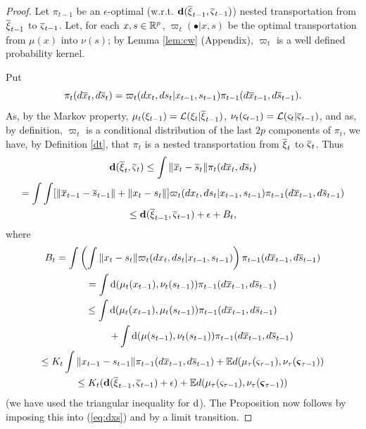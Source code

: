 \documentclass{article}              %
\begin{document}
\begin{proof}
Let $\pi_{t-1}$ be an $\epsilon$-optimal (w.r.t. $\mathbf{d}(\overline{\xi}_{t-1},\overline{\varsigma}_{t-1})$)
nested transportation from $\overline{\xi}_{t-1}$ to $\overline{\varsigma}_{t-1}$. Let,
for each $x,s\in\mathbb{R}^{p}$, $\varpi_{t}(\bullet|x,s)$ be the optimal
transportation from $\mu(x)$ into $\nu(s)$; by Lemma \ref{lem:cw} (Appendix),
$\varpi_{t}$ is a well defined probability kernel.

Put
\[
\pi_{t}(d\overline{x}_{t},d\overline{s}_{t})=\varpi_{t}(dx_{t},ds_{t}|x_{t-1},s_{t-1})\pi_{t-1}(d\overline{x}_{t-1},d\overline{s}_{t-1}).
\]
As, by the Markov property, $\mu_{t}(\xi_{t-1})=\mathcal{L}(\xi_{t}|\overline{\xi}_{t-1})$,
$\nu_{t}(\varsigma_{t-1})=\mathcal{L}(\varsigma_{t}|\overline{\varsigma}_{t-1})$,
and as, by definition, $\varpi_{t}$ is a conditional distribution
of the last $2p$ components of $\pi_{t}$, we have, by Definition
\ref{dt}, that $\pi_{t}$ is a nested transportation from $\overline{\xi}_{t}$
to $\overline{\varsigma}_{t}$. Thus 
\begin{multline}
\mathbf{d}(\overline{\xi}_{t},\overline{\varsigma}_{t})\leq\int\|\overline{x}_{t}-\overline{s}_{t}\|\pi_{t}(d\overline{x}_{t},d\overline{s}_{t})\\
=\int\int[\|\overline{x}_{t-1}-\overline{s}_{t-1}\|+\|x_{t}-s_{t}\|]\varpi_{t}(dx_{t},ds_{t}|x_{t-1},s_{t-1})\pi_{t-1}(d\overline{x}_{t-1},d\overline{s}_{t-1})\\
\leq\mathbf{d}(\overline{\xi}_{t-1},\overline{\varsigma}_{t-1})+\epsilon+B_{t},\label{eq:dxs}
\end{multline}
where
\begin{multline*}
B_{t}=\int\left(\int\|x{}_{t}-s_{t}\|\varpi_{t}(dx_{t},ds_{t}|x_{t-1},s_{t-1})\right)\pi_{t-1}(d\overline{x}_{t-1},d\overline{s}_{t-1})\\
=\mathrm{\int d}(\mu_{t}(x_{t-1}),\nu_{t}(s_{t-1}))\pi_{t-1}(d\overline{x}_{t-1},d\overline{s}_{t-1})\\
\leq\int\mathrm{d}(\mu_{t}(x_{t-1}),\mu_{t}(s_{t-1}))\pi_{t-1}(d\overline{x}_{t-1},d\overline{s}_{t-1})\\
\qquad\qquad+\int\mathrm{d}(\mu(s_{t-1}),\nu_{t}(s_{t-1}))\pi_{t-1}(d\overline{x}_{t-1},d\overline{s}_{t-1})\\
\leq K_{t}\int\|x_{t-1}-s_{t-1}\|\pi_{t-1}(d\overline{x}_{t-1},d\overline{s}_{t-1})+\mathbb{E} d(\mu_{\tau}(\varsigma_{\text{\ensuremath{\tau}}-1}),\nu_{\tau}(\boldsymbol{\varsigma}_{\tau-1}))\\
\leq K_{t}(\mathrm{\mathbf{d}}(\overline{\xi}_{t-1},\overline{\varsigma}_{t-1})+\epsilon)+\mathbb{E} d(\mu_{\tau}(\varsigma_{\text{\ensuremath{\tau}}-1}),\nu_{\tau}(\boldsymbol{\varsigma}_{\tau-1}))
\end{multline*}
(we have used the triangular inequality for $\mathrm{d}$). The Proposition
now follows by imposing this into (\ref{eq:dxs}) and by a limit transition. 
\end{proof}
\end{document}
